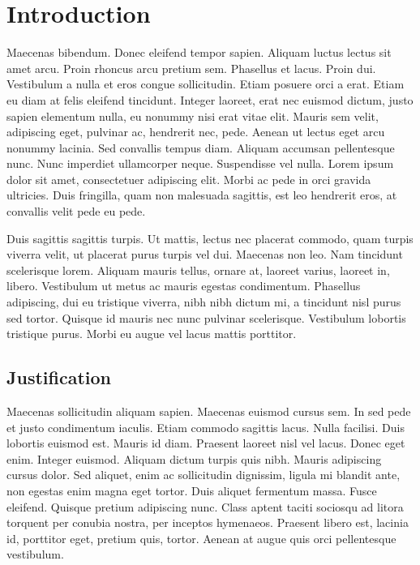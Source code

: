 \chapter{Introduction}\label{Introduction}
Maecenas bibendum. Donec eleifend tempor sapien. Aliquam luctus lectus sit amet arcu. Proin rhoncus arcu pretium sem. Phasellus et lacus. Proin dui. Vestibulum a nulla et eros congue sollicitudin. Etiam posuere orci a erat. Etiam eu diam at felis eleifend tincidunt. Integer laoreet, erat nec euismod dictum, justo sapien elementum nulla, eu nonummy nisi erat vitae elit. Mauris sem velit, adipiscing eget, pulvinar ac, hendrerit nec, pede. Aenean ut lectus eget arcu nonummy lacinia. Sed convallis tempus diam. Aliquam accumsan pellentesque nunc. Nunc imperdiet ullamcorper neque. Suspendisse vel nulla. Lorem ipsum dolor sit amet, consectetuer adipiscing elit. Morbi ac pede in orci gravida ultricies. Duis fringilla, quam non malesuada sagittis, est leo hendrerit eros, at convallis velit pede eu pede. 

Duis sagittis sagittis turpis. Ut mattis, lectus nec placerat commodo, quam turpis viverra velit, ut placerat purus turpis vel dui. Maecenas non leo. Nam tincidunt scelerisque lorem. Aliquam mauris tellus, ornare at, laoreet varius, laoreet in, libero. Vestibulum ut metus ac mauris egestas condimentum. Phasellus adipiscing, dui eu tristique viverra, nibh nibh dictum mi, a tincidunt nisl purus sed tortor. Quisque id mauris nec nunc pulvinar scelerisque. Vestibulum lobortis tristique purus. Morbi eu augue vel lacus mattis porttitor. 



\section{Justification}\label{Introduction_Justification}
Maecenas sollicitudin aliquam sapien. Maecenas euismod cursus sem. In sed pede et justo condimentum iaculis. Etiam commodo sagittis lacus. Nulla facilisi. Duis lobortis euismod est. Mauris id diam. Praesent laoreet nisl vel lacus. Donec eget enim. Integer euismod. Aliquam dictum turpis quis nibh. Mauris adipiscing cursus dolor. Sed aliquet, enim ac sollicitudin dignissim, ligula mi blandit ante, non egestas enim magna eget tortor. Duis aliquet fermentum massa. Fusce eleifend. Quisque pretium adipiscing nunc. Class aptent taciti sociosqu ad litora torquent per conubia nostra, per inceptos hymenaeos. Praesent libero est, lacinia id, porttitor eget, pretium quis, tortor. Aenean at augue quis orci pellentesque vestibulum. 
